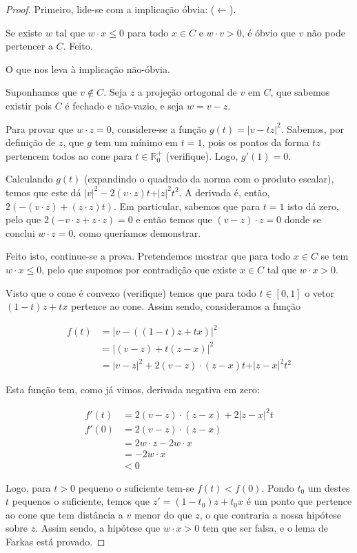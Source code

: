 \documentclass{article}
\newcommand{\R}{\mathbb{R}}
\theoremstyle{definition}
\begin{document}
	\begin{proof}
	Primeiro, lide-se com a implicação óbvia: ($\leftarrow$).
	
	Se existe $w$ tal que $w \cdot x \leq 0$ para todo $x \in C$ e $w \cdot v > 0$, é óbvio que $v$ não pode pertencer a $C$. Feito.
	
	O que nos leva à implicação não-óbvia.
	
	Suponhamos que $v \not \in C$. Seja $z$ a projeção ortogonal de $v$ em $C$, que sabemos existir pois $C$ é fechado e não-vazio, e seja $w = v - z$.
	
	Para provar que $w \cdot z = 0$, considere-se a função $g(t) = \rvert v - t z \lvert ^2$. Sabemos, por definição de $z$, que $g$ tem um mínimo em $t = 1$, pois os pontos da forma $tz$ pertencem todos ao cone para $t \in \R^+_0$ (verifique). Logo, $g'(1) = 0$.
	
	Calculando $g(t)$ (expandindo o quadrado da norma com o produto escalar), temos que este dá $\rvert v \lvert ^2 - 2 (v \cdot z) t + \rvert z \lvert ^2 t^2$. A derivada é, então, $2 (-(v \cdot z) + (z \cdot z) t)$. Em particular, sabemos que para $t = 1$ isto dá zero, pelo que $2 (-v \cdot z + z \cdot z) = 0$ e então temos que $(v - z) \cdot z = 0$ donde se conclui $w \cdot z = 0$, como queríamos demonstrar.
	
	Feito isto, continue-se a prova. Pretendemos mostrar que para todo $x \in C$ se tem $w \cdot x \leq 0$, pelo que supomos por contradição que existe $x \in C$ tal que $w \cdot x > 0$.
	
	Visto que o cone é convexo (verifique) temos que para todo $t \in [0,1]$ o vetor $(1-t)z + tx$ pertence ao cone. Assim sendo, consideramos a função
	
	
	\begin{align*}
	f(t) &= \rvert v - ((1-t)z + tx) \lvert^2 \\
	&= \rvert(v - z) + t(z - x)\lvert^2 \\
	&= \rvert v-z \lvert^2 + 2 (v - z) \cdot (z - x) t + \rvert z - x \lvert^2 t^2
	\end{align*}
	
	Esta função tem, como já vimos, derivada negativa em zero:
	
	
	\begin{align*}
	f'(t) &= 2 (v - z) \cdot (z - x) + 2 \rvert z - x \lvert^2 t \\
	f'(0) &= 2 (v - z) \cdot (z - x)\\
	&= 2 w \cdot z - 2 w \cdot x\\
	&= - 2 w \cdot x\\
	&< 0
	\end{align*}
	
	Logo, para $t>0$ pequeno o suficiente tem-se $f(t) < f(0)$. Pondo $t_0$ um destes $t$ pequenos o suficiente, temos que $z' = (1-t_0)z + t_0 x$ é um ponto que pertence ao cone que tem distância a $v$ menor do que $z$, o que contraria a nossa hipótese sobre $z$. Assim sendo, a hipótese que $w \cdot x > 0$ tem que ser falsa, e o lema de Farkas está provado.
	\end{proof}
	
\end{document}
